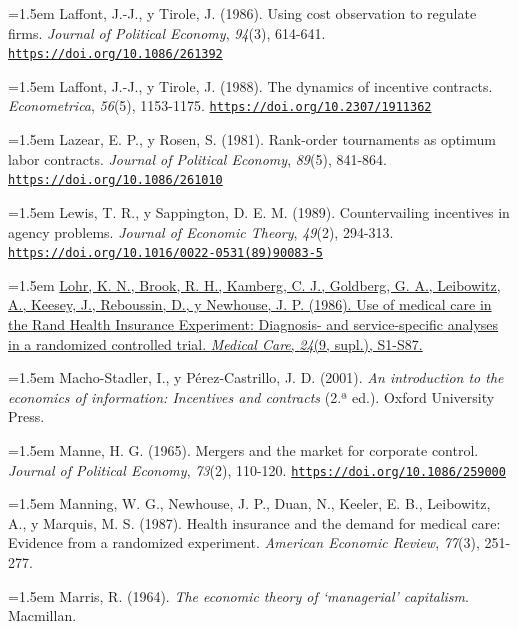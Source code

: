 \documentclass[10pt,a4paper]{article}
\begin{document}
\noindent\hangindent=1.5em Laffont, J.-J., y Tirole, J. (1986). Using cost observation to regulate firms. \textit{Journal of Political Economy}, \textit{94}(3), 614-641. \href{https://doi.org/10.1086/261392}{\nolinkurl{https://doi.org/10.1086/261392}}

\noindent\hangindent=1.5em Laffont, J.-J., y Tirole, J. (1988). The dynamics of incentive contracts. \textit{Econometrica}, \textit{56}(5), 1153-1175. \href{https://doi.org/10.2307/1911362}{\nolinkurl{https://doi.org/10.2307/1911362}}

\noindent\hangindent=1.5em Lazear, E. P., y Rosen, S. (1981). Rank-order tournaments as optimum labor contracts. \textit{Journal of Political Economy}, \textit{89}(5), 841-864. \href{https://doi.org/10.1086/261010}{\nolinkurl{https://doi.org/10.1086/261010}}

\noindent\hangindent=1.5em Lewis, T. R., y Sappington, D. E. M. (1989). Countervailing incentives in agency problems. \textit{Journal of Economic Theory}, \textit{49}(2), 294-313. \href{https://doi.org/10.1016/0022-0531(89)90083-5}{\nolinkurl{https://doi.org/10.1016/0022-0531(89)90083-5}}

\noindent\hangindent=1.5em \href{https://pubmed.ncbi.nlm.nih.gov/3093785/}{Lohr, K. N., Brook, R. H., Kamberg, C. J., Goldberg, G. A., Leibowitz, A., Keesey, J., Reboussin, D., y Newhouse, J. P. (1986). Use of medical care in the Rand Health Insurance Experiment: Diagnosis- and service-specific analyses in a randomized controlled trial. \textit{Medical Care}, \textit{24}(9, supl.), S1-S87.}

\noindent\hangindent=1.5em Macho-Stadler, I., y Pérez-Castrillo, J. D. (2001). \textit{An introduction to the economics of information: Incentives and contracts} (2.ª ed.). Oxford University Press.

\noindent\hangindent=1.5em Manne, H. G. (1965). Mergers and the market for corporate control. \textit{Journal of Political Economy}, \textit{73}(2), 110-120. \href{https://doi.org/10.1086/259000}{\nolinkurl{https://doi.org/10.1086/259000}}

\noindent\hangindent=1.5em Manning, W. G., Newhouse, J. P., Duan, N., Keeler, E. B., Leibowitz, A., y Marquis, M. S. (1987). Health insurance and the demand for medical care: Evidence from a randomized experiment. \textit{American Economic Review}, \textit{77}(3), 251-277.

\noindent\hangindent=1.5em Marris, R. (1964). \textit{The economic theory of `managerial' capitalism}. Macmillan.
\end{document}
